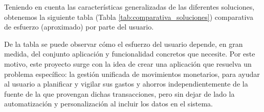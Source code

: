 Teniendo en cuenta las características generalizadas de las diferentes soluciones, 
obtenemos la siguiente tabla (Tabla \ref{tab:comparativa_soluciones}) comparativa de esfuerzo (aproximado) por parte del usuario.

De la tabla se puede observar cómo el esfuerzo del usuario depende, en gran medida, del conjunto aplicación y funcionalidad concretos que necesite. Por este motivo, este proyecto surge con la idea de crear una aplicación que resuelva un problema específico: la gestión unificada de movimientos monetarios, para ayudar al usuario a planificar y vigilar sus gastos y ahorros independientemente de la fuente de la que provengan dichas transacciones, pero sin dejar de lado la automatización y personalización al incluir los datos en el sistema.


